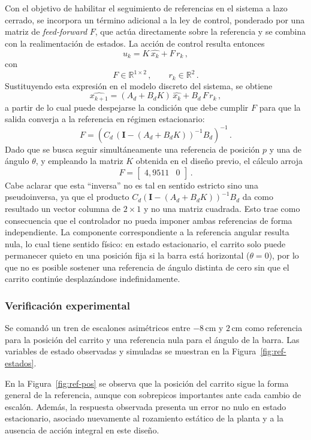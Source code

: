 Con el objetivo de habilitar el seguimiento de referencias en el sistema a lazo cerrado, se incorpora un término adicional a la ley de control, ponderado por una matriz de \textit{feed-forward} $F$, que actúa directamente sobre la referencia y se combina con la realimentación de estados. La acción de control resulta entonces
\[
u_k = K\,\widehat{x_k} + F\,r_k\,,
\]
con
\[
F \in \mathbb{R}^{1\times 2}\,, \qquad r_k \in \mathbb{R}^{2}\,.
\]
Sustituyendo esta expresión en el modelo discreto del sistema, se obtiene
\[
\widehat{x_{k+1}} = (A_d + B_d K)\,\widehat{x_k} + B_d\,F\,r_k\,,
\]
a partir de lo cual puede despejarse la condición que debe cumplir $F$ para que la salida converja a la referencia en régimen estacionario:
\[
F = \left( C_d\,(\mathbf{I} - (A_d + B_d K))^{-1} B_d \right)^{-1}\,.
\]
Dado que se busca seguir simultáneamente una referencia de posición $p$ y una de ángulo $\theta$, y empleando la matriz $K$ obtenida en el diseño previo, el cálculo arroja
\[
F = \begin{bmatrix} 4,9511 & 0 \end{bmatrix}\,.
\]
Cabe aclarar que esta ``inversa'' no es tal en sentido estricto sino una pseudoinversa, ya que el producto $C_d (\mathbf{I}-(A_d + B_d K))^{-1} B_d$ da como resultado un vector columna de $2\times 1$ y no una matriz cuadrada. Esto trae como consecuencia que el controlador no pueda imponer ambas referencias de forma independiente. La componente correspondiente a la referencia angular resulta nula, lo cual tiene sentido físico: en estado estacionario, el carrito solo puede permanecer quieto en una posición fija si la barra está horizontal ($\theta = 0$), por lo que no es posible sostener una referencia de ángulo distinta de cero sin que el carrito continúe desplazándose indefinidamente.

\subsubsection{Verificación experimental}

Se comandó un tren de escalones asimétricos entre $-8\,$cm y $2\,$cm como referencia para la posición del carrito y una referencia nula para el ángulo de la barra. Las variables de estado observadas y simuladas se muestran en la Figura~\ref{fig:ref-estados}.

En la Figura~\ref{fig:ref-pos} se observa que la posición del carrito sigue la forma general de la referencia, aunque con sobrepicos importantes ante cada cambio de escalón. Además, la respuesta observada presenta un error no nulo en estado estacionario, asociado nuevamente al rozamiento estático de la planta y a la ausencia de acción integral en este diseño.

